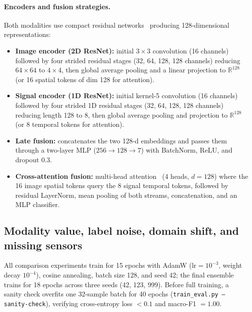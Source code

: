 \paragraph{Encoders and fusion strategies.} Both modalities use compact residual networks~\cite{he2016}
producing 128-dimensional representations:
\begin{itemize}
  \item \textbf{Image encoder (2D ResNet):} initial $3\times 3$ convolution (16 channels) followed by
  four strided residual stages (32, 64, 128, 128 channels) reducing $64\times 64$ to $4\times 4$, then
  global average pooling and a linear projection to $\mathbb{R}^{128}$ (or 16 spatial tokens of dim
  128 for attention).
  \item \textbf{Signal encoder (1D ResNet):} initial kernel-5 convolution (16 channels) followed by
  four strided 1D residual stages (32, 64, 128, 128 channels) reducing length 128 to 8, then global
  average pooling and projection to $\mathbb{R}^{128}$ (or 8 temporal tokens for attention).
  \item \textbf{Late fusion:} concatenates the two 128-d embeddings and passes them through a
  two-layer MLP ($256 \to 128 \to 7$) with BatchNorm, ReLU, and dropout $0.3$.
  \item \textbf{Cross-attention fusion:} multi-head attention~\cite{vaswani2017} (4 heads,
  $d=128$) where the 16 image spatial tokens query the 8 signal temporal tokens, followed by residual
  LayerNorm, mean pooling of both streams, concatenation, and an MLP classifier.
\end{itemize}

\subsection{Modality value, label noise, domain shift, and missing sensors}
\label{sec:t1-experiments}

All comparison experiments train for 15 epochs with AdamW ($\text{lr}=10^{-3}$, weight decay
$10^{-4}$), cosine annealing, batch size 128, and seed 42; the final ensemble trains for 18 epochs
across three seeds (42, 123, 999). Before full training, a sanity check overfits one 32-sample batch
for 40 epochs (\texttt{train\_eval.py --sanity-check}), verifying cross-entropy loss $< 0.1$ and
macro-F1 $= 1.00$.

